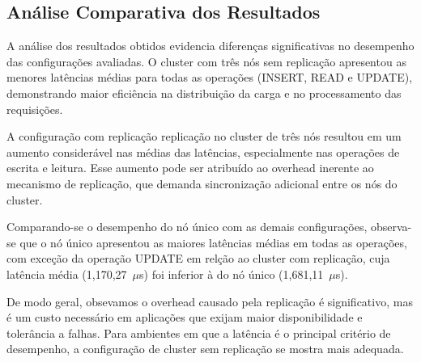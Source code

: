 \subsection{Análise Comparativa dos Resultados}

A análise dos resultados obtidos evidencia diferenças significativas no desempenho das configurações avaliadas.
O cluster com três nós sem replicação apresentou as menores latências médias para todas as operações (INSERT, READ e UPDATE),
demonstrando maior eficiência na distribuição da carga e no processamento das requisições.

A configuração com replicação replicação no cluster de três nós resultou em um aumento considerável nas médias das latências,
especialmente nas operações de escrita e leitura. 
Esse aumento pode ser atribuído ao overhead inerente ao mecanismo de replicação, que demanda sincronização adicional entre os nós do cluster.

Comparando-se o desempenho do nó único com as demais configurações,
observa-se que o nó único apresentou as maiores latências médias em todas as operações, 
com exceção da operação UPDATE em relção ao cluster com replicação, cuja latência média (1,170,27~$\mu$s) foi inferior à do nó único (1,681,11~$\mu$s).

De modo geral, obsevamos o overhead causado pela replicação é significativo,
mas é um custo necessário em aplicações que exijam maior disponibilidade e tolerância a falhas.
Para ambientes em que a latência é o principal critério de desempenho, a configuração de cluster sem replicação se mostra mais adequada.